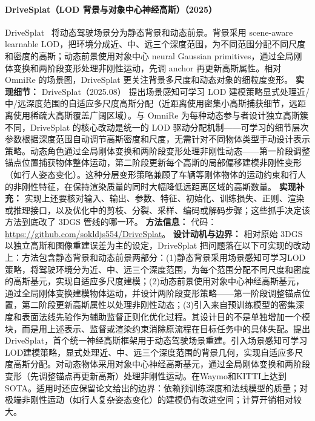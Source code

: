 \paragraph{DriveSplat（LOD 背景与对象中心神经高斯）（2025）}
DriveSplat~\cite{2508_15376} 将动态驾驶场景分为静态背景和动态前景。背景采用 scene-aware learnable LOD，把环境分成近、中、远三个深度范围，为不同范围分配不同尺度和密度的高斯；动态前景使用对象中心 neural Gaussian primitives，通过全局刚体变换和两阶段变形处理非刚性运动，先调 anchor 再更新高斯属性。相对 OmniRe 的场景图，DriveSplat 更关注背景多尺度和动态对象的细粒度变形。
\textbf{实现细节：} DriveSplat（2025.08） 提出场景感知可学习 LOD 建模策略显式处理近/中/远深度范围的自适应多尺度高斯分配（近距离使用密集小高斯捕获细节，远距离使用稀疏大高斯覆盖广阔区域）。与 OmniRe 为每种动态参与者设计独立高斯簇不同，DriveSplat 的核心改动是统一的 LOD 驱动分配机制——可学习的细节层次参数根据深度范围自动调节高斯密度和尺度，无需针对不同物体类型手动设计表示策略。动态角色通过全局刚体变换和两阶段变形处理非刚性动态——第一阶段调整锚点位置捕获物体整体运动，第二阶段更新每个高斯的局部偏移建模非刚性变形（如行人姿态变化）。这种分层变形策略兼顾了车辆等刚体物体的运动约束和行人的非刚性特征，在保持渲染质量的同时大幅降低远距离区域的高斯数量。
\textbf{实现补充：} 实现上还要核对输入、输出、参数、特征、初始化、训练损失、正则、渲染或推理接口，以及优化中的剪枝、分裂、采样、编码或解码步骤；这些抓手决定该方法到底改了 3DGS 管线的哪一环。
\textbf{方法信息：} 代码：\url{https://github.com/sokldjs554/DriveSplat}。
\textbf{设计动机与边界：} 相对原始 3DGS 以独立高斯和图像重建误差为主的设定，DriveSplat 把问题落在以下可实现的改动上：方法包含静态背景和动态前景两部分：(1)静态背景采用场景感知可学习LOD策略，将驾驶环境分为近、中、远三个深度范围，为每个范围分配不同尺度和密度的高斯基元，实现自适应多尺度建模；(2)动态前景使用对象中心神经高斯基元，通过全局刚体变换建模物体运动，并设计两阶段变形策略——第一阶段调整锚点位置，第二阶段更新高斯属性以处理非刚性动态；(3)引入来自预训练模型的密集深度和表面法线先验作为辅助监督正则化优化过程。其设计目的不是单独增加一个模块，而是用上述表示、监督或渲染约束消除原流程在目标任务中的具体失配。提出DriveSplat，首个统一神经高斯框架用于动态驾驶场景重建。引入场景感知可学习LOD建模策略，显式处理近、中、远三个深度范围的背景几何，实现自适应多尺度高斯分配。对动态物体采用对象中心神经高斯基元，通过全局刚体变换和两阶段变形（先调整锚点再更新高斯）处理非刚性运动。在Waymo和KITTI上达到SOTA。适用时还应保留论文给出的边界：依赖预训练深度和法线模型的质量；对极端非刚性运动（如行人复杂姿态变化）的建模仍有改进空间；计算开销相对较大。

